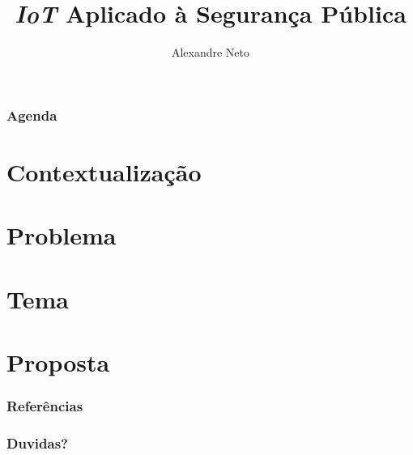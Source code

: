 \documentclass[14pt]{beamer}
\author{Alexandre Neto}
\title{\textit{IoT} Aplicado à Segurança Pública}
\institute{
	Análise e Desenvolvimento de Sistemas\\
	Fatec-SJC
	}
\begin{document}
\begin{frame}
\titlepage
\end{frame}

\begin{frame}
\frametitle{Agenda}
\tableofcontents
\end{frame}

\section{Contextualização}


\section{Problema}


\section{Tema}


\section{Proposta}


\begin{frame}
	\frametitle{Referências}
\end{frame}

\begin{frame}
	\frametitle{Duvidas?}
\end{frame}
\end{document}
